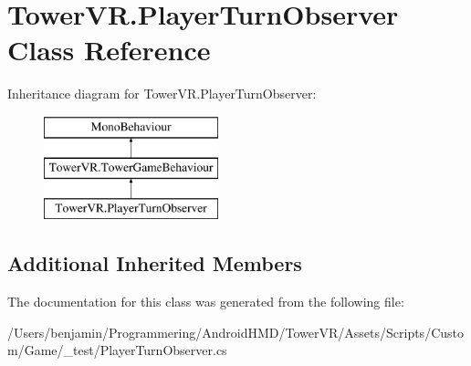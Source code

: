 \hypertarget{class_tower_v_r_1_1_player_turn_observer}{}\section{Tower\+V\+R.\+Player\+Turn\+Observer Class Reference}
\label{class_tower_v_r_1_1_player_turn_observer}
Inheritance diagram for Tower\+V\+R.\+Player\+Turn\+Observer\+:\begin{figure}[H]
\begin{center}
\leavevmode
\includegraphics[height=3.000000cm]{class_tower_v_r_1_1_player_turn_observer}
\end{center}
\end{figure}
\subsection*{Additional Inherited Members}


The documentation for this class was generated from the following file\+:\begin{DoxyCompactItemize}
\item 
/\+Users/benjamin/\+Programmering/\+Android\+H\+M\+D/\+Tower\+V\+R/\+Assets/\+Scripts/\+Custom/\+Game/\+\_\+test/Player\+Turn\+Observer.\+cs\end{DoxyCompactItemize}

